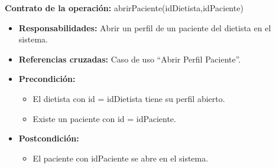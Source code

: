 \textbf{Contrato de la operación:} abrirPaciente(idDietista,idPaciente)
\begin{itemize}
\item \textbf{Responsabilidades:} Abrir un perfil de un paciente del dietista en el sistema.
\item \textbf{Referencias cruzadas:} Caso de uso ``Abrir Perfil Paciente''.
\item \textbf{Precondición:}
\begin{itemize}
\item El dietista con id = idDietista tiene su perfil abierto.
\item Existe un paciente con id = idPaciente.
\end{itemize}
\item \textbf{Postcondición:}
\begin{itemize}
\item El paciente con idPaciente se abre en el sistema.
\end{itemize}
\end{itemize}


